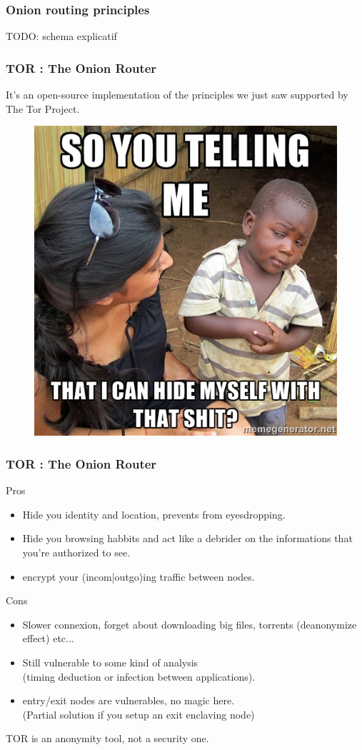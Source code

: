 \begin{frame}
\begin{center}
\frametitle{Onion routing principles}
TODO: schema explicatif
\end{center}
\end{frame}


\begin{frame}
\frametitle{TOR : The Onion Router}
It's an open-source implementation of the principles we just saw supported by
The Tor Project.
\begin{figure}
\includegraphics[width=0.5\linewidth]{./materials/septical_boy}
\end{figure}
\end{frame}
\begin{frame}
\frametitle{TOR : The Onion Router}
\begin{block}{Pros}
\begin{itemize}
\item Hide you identity and location, prevents from eyesdropping.
\item Hide you browsing habbits and act like a debrider on the informations that
you're authorized to see.
\item encrypt your (incom|outgo)ing traffic between nodes.
\end{itemize}
\end{block}
\begin{block}{Cons}
\begin{itemize}
\item Slower connexion, forget about downloading big files, torrents
(deanonymize effect) etc...
\item Still vulnerable to some kind of analysis
\\ (timing deduction or infection between applications).
\item entry/exit nodes are vulnerables, no magic here.
\\ (Partial solution if you setup an exit enclaving node)
\end{itemize}
\end{block}
TOR is an anonymity tool, not a security one.
\end{frame}


